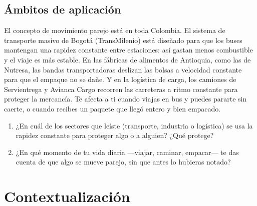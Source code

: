 \documentclass[
  spanish,
  letterpaper,
  12pt,
  oneside,
  open=any,
  DIV=15]{scrbook}
\providecommand{\tightlist}{%
  \setlength{\itemsep}{0pt}\setlength{\parskip}{0pt}}
\newcommand{\setcolorsection}[2]{%
  \definecolor{currentsectionbg}{HTML}{#1}%
  \definecolor{currentsectionborder}{HTML}{#2}%
}
\begin{document}
\subsection{Ámbitos de aplicación}\label{uxe1mbitos-de-aplicaciuxf3n-5}

El concepto de movimiento parejo está en toda Colombia. El sistema de
transporte masivo de Bogotá (TransMilenio) está diseñado para que los
buses mantengan una rapidez constante entre estaciones: así gastan menos
combustible y el viaje es más estable. En las fábricas de alimentos de
Antioquia, como las de Nutresa, las bandas transportadoras deslizan las
bolsas a velocidad constante para que el empaque no se dañe. Y en la
logística de carga, los camiones de Servientrega y Avianca Cargo
recorren las carreteras a ritmo constante para proteger la mercancía. Te
afecta a ti cuando viajas en bus y puedes pararte sin caerte, o cuando
recibes un paquete que llegó entero y bien empacado.

\begin{tcolorbox}[enhanced jigsaw, arc=.35mm, bottomrule=.15mm, bottomtitle=1mm, breakable, colback=white, colbacktitle=quarto-callout-note-color!10!white, colframe=quarto-callout-note-color-frame, coltitle=black, left=2mm, leftrule=.75mm, opacityback=0, opacitybacktitle=0.6, rightrule=.15mm, title=\textcolor{quarto-callout-note-color}{\faInfo}\hspace{0.5em}{Conexión con el Mundo Real}, titlerule=0mm, toprule=.15mm, toptitle=1mm]

\begin{enumerate}
\def\labelenumi{\arabic{enumi}.}
\tightlist
\item
  ¿En cuál de los sectores que leíste (transporte, industria o
  logística) se usa la rapidez constante para proteger algo o a alguien?
  ¿Qué protege?
\item
  ¿En qué momento de tu vida diaria ---viajar, caminar, empacar--- te
  das cuenta de que algo se mueve parejo, sin que antes lo hubieras
  notado?
\end{enumerate}

\end{tcolorbox}

\setcolorsection{f2c6a0}{e0b088}

\section{Contextualización}\label{contextualizaciuxf3n-5}
\end{document}
